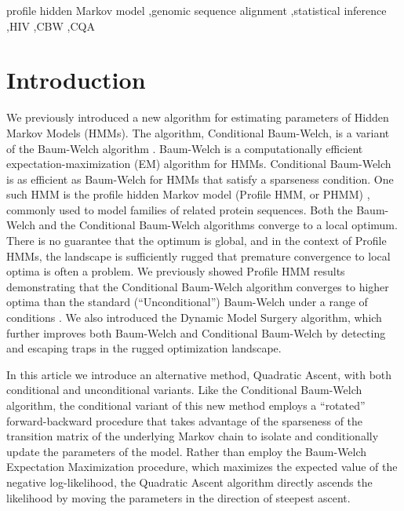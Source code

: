 \documentclass[preprint,12pt,authoryear]{elsarticle}
\begin{document}
\begin{frontmatter}
\begin{keyword}
profile hidden Markov model \sep genomic sequence alignment \sep statistical inference \sep HIV \sep CBW \sep CQA




\end{keyword}

\end{frontmatter}


\section{Introduction}
\label{Introduction}
We previously introduced a new algorithm for estimating parameters
of Hidden Markov Models (HMMs).  The algorithm, Conditional
Baum-Welch, is a variant of the Baum-Welch algorithm
\citep{Baum:1972}.  Baum-Welch is a computationally efficient
expectation-maximization (EM) algorithm \citep{DempsterEM:1977,
  scott:2002} for HMMs.  Conditional Baum-Welch is as efficient as
Baum-Welch for HMMs that satisfy a sparseness condition.  One such HMM
is the profile hidden Markov model (Profile HMM, or PHMM) \citep{Rabiner:1989, Durbin}, commonly used to
model families of related protein sequences.  Both the Baum-Welch and
the Conditional Baum-Welch algorithms converge to a local optimum.  There is no guarantee that the optimum is
global, and in the context of Profile HMMs, the landscape is
sufficiently rugged that premature convergence to local optima is
often a problem.  We previously showed Profile HMM results demonstrating that
the Conditional Baum-Welch algorithm converges to higher optima than
the standard (``Unconditional'') Baum-Welch under a range of conditions \citep{edlefsen2010transposon}.  We also introduced the
Dynamic Model Surgery algorithm, which further improves both
Baum-Welch and Conditional Baum-Welch by detecting and escaping traps
in the rugged optimization landscape.

In this article we introduce an alternative method, Quadratic Ascent, with both
conditional and unconditional variants.  Like the Conditional
Baum-Welch algorithm, the conditional variant of this new method
employs a ``rotated'' forward-backward procedure that takes advantage
of the sparseness of the transition matrix of the underlying Markov
chain to isolate and conditionally update the parameters of the model.
Rather than employ the Baum-Welch Expectation Maximization procedure, which maximizes the expected value of the negative
log-likelihood, the Quadratic Ascent algorithm directly ascends the
likelihood by moving the parameters in the direction of steepest ascent.
\end{document}
